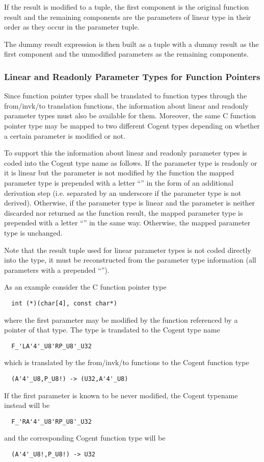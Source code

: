 If the result is modified to a tuple, the first component is the original function result and the remaining components
are the parameters of linear type in their order as they occur in the parameter tuple.

The dummy result expression is then built as a tuple with a dummy result as the first component and the unmodified
parameters as the remaining components.

\subsubsection{Linear and Readonly Parameter Types for Function Pointers}

Since function pointer types shall be translated to function types through the from/invk/to translation functions, the 
information about linear and readonly parameter types must also be available for them. Moreover, the same C function
pointer type may be mapped to two different Cogent types depending on whether a certain parameter is modified or not. 

To support this the information about linear and readonly parameter types is coded into the Cogent type name as follows.
If the parameter type is readonly or it is linear but the parameter is not modified by the function the mapped
parameter type is prepended with a letter ``'' in the form of an additional derivation step (i.e. separated by 
an underscore if the parameter type is not derived). Otherwise, if the parameter type is linear and the parameter is 
neither discarded nor returned as the function result, the mapped parameter type is prepended with a 
letter ``'' in the same way. Otherwise, the mapped parameter type is unchanged.

Note that the result tuple used for linear parameter types is not coded directly into the type, it must be 
reconstructed from the parameter type information (all parameters with a prepended ``''). 

As an example consider the C function pointer type
\begin{verbatim}
  int (*)(char[4], const char*)
\end{verbatim}
where the first parameter may be modified by the function referenced by a pointer of that type.
The type is translated to the Cogent type name
\begin{verbatim}
  F_'LA'4'_U8'RP_U8'_U32
\end{verbatim}
which is translated by the from/invk/to functions to the Cogent function type
\begin{verbatim}
  (A'4'_U8,P_U8!) -> (U32,A'4'_U8)
\end{verbatim}
If the first parameter is known to be never modified, the Cogent typename instead will be
\begin{verbatim}
  F_'RA'4'_U8'RP_U8'_U32
\end{verbatim}
and the corresponding Cogent function type will be
\begin{verbatim}
  (A'4'_U8!,P_U8!) -> U32
\end{verbatim}

